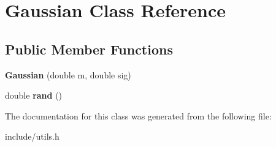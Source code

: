 \hypertarget{classGaussian}{}\section{Gaussian Class Reference}
\label{classGaussian}
\subsection*{Public Member Functions}
\begin{DoxyCompactItemize}
\item 
{\bfseries Gaussian} (double m, double sig)\hypertarget{classGaussian_a1fa99b6e4f0a1d1c20d2205165194974}{}\label{classGaussian_a1fa99b6e4f0a1d1c20d2205165194974}

\item 
double {\bfseries rand} ()\hypertarget{classGaussian_a6b08383f1e4d0dae8f388aa15a70a9b0}{}\label{classGaussian_a6b08383f1e4d0dae8f388aa15a70a9b0}

\end{DoxyCompactItemize}


The documentation for this class was generated from the following file\+:\begin{DoxyCompactItemize}
\item 
include/utils.\+h\end{DoxyCompactItemize}
